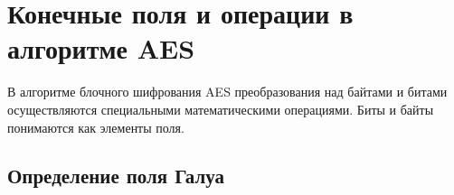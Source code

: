 \section{Конечные поля и операции в алгоритме AES}

В алгоритме блочного шифрования AES преобразования над байтами и битами осуществляются специальными математическими операциями. Биты и байты понимаются как элементы поля.

\subsection{Определение поля Галуа}


